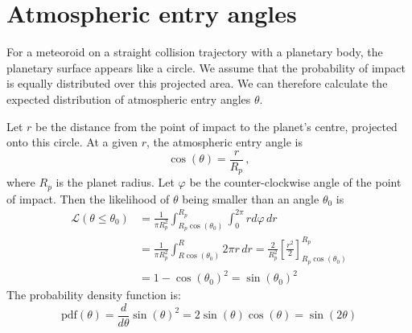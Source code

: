\section{Atmospheric entry angles}
\label{sec:angle_prior}
For a meteoroid on a straight collision trajectory with a planetary body, the planetary surface appears like a circle. We assume that the probability of impact is equally distributed over this projected area. We can therefore calculate the expected distribution of atmospheric entry angles $\theta$.

Let $r$ be the distance from the point of impact to the planet's centre, projected onto this circle. At a given $r$, the atmospheric entry angle is
\begin{equation*}
    \cos(\theta) = \frac{r}{R_p}\,,
\end{equation*}
where $R_p$ is the planet radius. Let $\varphi$ be the counter-clockwise angle of the point of impact. Then the likelihood of $\theta$ being smaller than an angle $\theta_0$ is
\begin{align}
    \mathcal{L}(\theta \leq \theta_0) &= \frac{1}{\pi R_p^2} \int_{R_p\cos(\theta_0)}^{R_p} \int_0^{2\pi} r d\varphi\, dr \nonumber\\
    &= \frac{1}{\pi R_p^2} \int_{R\cos(\theta_0)}^R 2\pi r\, dr = \frac{2}{R_p^2} \left[\frac{r^2}{2}\right]_{R_p\cos(\theta_0)}^{R_p} \nonumber\\
    &= 1 - \cos(\theta_0)^2 = \sin(\theta_0)^2
\end{align}
The probability density function is:
\begin{equation}
    \mathrm{pdf}(\theta) = \frac{d}{d\theta}\sin(\theta)^2 = 2\sin(\theta)\cos(\theta) = \sin(2\theta)
\end{equation}

